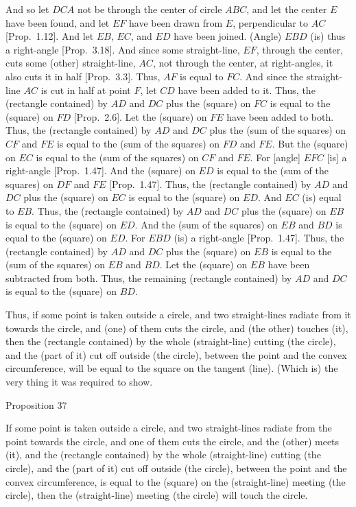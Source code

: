 And so let $DCA$ not be through the center of circle $ABC$, and let the center $E$
have been found, and let $EF$ have been drawn from $E$, perpendicular to
$AC$ [Prop.~1.12]. And let $EB$, $EC$, and $ED$ have been joined. (Angle)
$EBD$ (is) thus a right-angle [Prop.~3.18]. And since some straight-line, $EF$, through the
center, cuts some (other) straight-line, $AC$, not through the center, at
right-angles, it also cuts it in half [Prop.~3.3]. Thus, $AF$ is equal to
$FC$. And since the straight-line $AC$ is cut in half at point $F$, let $CD$ have
been added to it. Thus, the (rectangle contained) by $AD$ and
 $DC$ plus the
(square) on $FC$ is equal to the (square) on $FD$ [Prop.~2.6]. Let
the (square) on $FE$ have been added to both. Thus, the (rectangle contained)
by $AD$ and $DC$ plus the (sum of the squares) on $CF$ and $FE$ is equal to
the (sum of the squares) on $FD$ and $FE$. But  the (square) on $EC$  is equal to the (sum of the squares)
on $CF$ and $FE$. For [angle] $EFC$ [is] a
right-angle [Prop.~1.47]. And the (square) on $ED$ is equal to the (sum of the squares) on $DF$ and
$FE$   [Prop.~1.47]. Thus, the (rectangle
contained) by $AD$ and $DC$ plus the (square) on $EC$ is equal to the (square)
on $ED$. And $EC$ (is) equal to $EB$. Thus, the (rectangle
contained) by $AD$ and $DC$ plus the (square) on $EB$ is equal to the (square)
on $ED$. And the (sum of the squares) on 
$EB$ and $BD$  is equal to  the (square) on $ED$. For $EBD$ (is) a right-angle [Prop.~1.47]. Thus, the (rectangle
contained) by $AD$ and $DC$ plus the (square) on $EB$ is equal to the (sum of the squares)
on $EB$ and $BD$. Let the (square) on $EB$ have been subtracted from both. Thus, the remaining
(rectangle contained) by $AD$ and $DC$ is equal to the (square) on $BD$.

Thus, if some point is taken outside a circle, and  two straight-lines
radiate from it towards the circle, and (one) of them cuts the circle, and (the other) touches (it), then the (rectangle contained) by the whole  (straight-line) cutting (the circle), and the (part of it) 
cut off outside (the circle),
between the point and the convex circumference, will be equal to the
square on the tangent (line). (Which is) the very thing it was required to show.


\begin{center}
{\large Proposition 37}
\end{center}

If some point is taken outside a circle, and two straight-lines radiate
from the point towards the circle, and one of them cuts the circle, and the
(other) meets (it), and the (rectangle contained) by the whole (straight-line)
cutting (the circle), and the (part of it) 
cut off outside (the circle),
between the point and the convex circumference,  is equal to the (square)
on the (straight-line) meeting (the circle), then the (straight-line)
meeting (the circle) will touch the circle.

